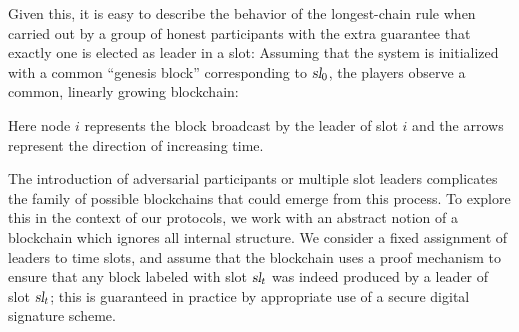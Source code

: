   Given this, it is easy to describe the behavior of the longest-chain
  rule when carried out by a group of honest participants with the extra
  guarantee that exactly one is elected as leader in a slot: Assuming
  that the system is initialized with a common ``genesis block''
  corresponding to $\textsl{sl}_0$, the players observe a common, linearly
  growing blockchain:
  \begin{center}
  \end{center}
  \noindent
  Here node $i$ represents the block broadcast by the leader of slot $i$
  and the arrows represent the direction of increasing time.

  The introduction of adversarial participants or multiple slot leaders
  complicates the family of possible blockchains that could emerge from
  this process. To explore this in the context of our protocols, we work
  with an abstract notion of a blockchain which
  ignores all internal structure. We consider a fixed assignment of
  leaders to time slots, and assume that the blockchain uses a proof
  mechanism to ensure that any block labeled with slot $\textsl{sl}_t$ was
  indeed produced by a leader of slot $\textsl{sl}_t$; this is guaranteed in
  practice by appropriate use of a secure digital signature scheme.

